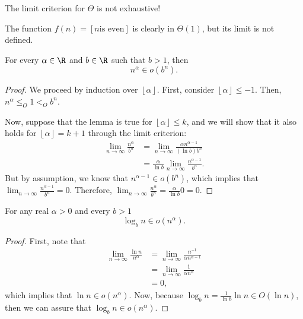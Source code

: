 \begin{note}
    The limit criterion for $\Theta$ is not exhaustive!
\end{note}
\begin{eg}
    The function $f(n) = \left[ n \text{is even} \right] $ is clearly in $\Theta(1)$, but its limit is not defined.
\end{eg}

\begin{lemma}
    For every $\alpha\in \R$ and $b\in \R$ such that $b>1$, then \[
	n^{\alpha} \in o(b^{n})
    .\] 
\end{lemma}
\begin{proof}
    We proceed by induction over $\left\lfloor \alpha \right\rfloor$.
    First, consider $\left\lfloor \alpha \right\rfloor \le  -1$.
    Then, $n^{\alpha}\le_O 1 <_O b^{n}$.

    Now, suppose that the lemma is true for $\left\lfloor \alpha \right\rfloor\le k$, and we will show that it also holds for $\left\lfloor \alpha \right\rfloor=k+1$ through the limit criterion:
    \begin{align*}
        \lim_{n \to \infty} \frac{n^{\alpha}}{b^{n}} &= \lim_{n \to \infty} \frac{\alpha n^{\alpha-1}}{(\ln b)b^{n}} \\
	&= \frac{\alpha}{\ln b} \lim_{n \to \infty} \frac{n^{\alpha-1}}{b^{n}}
    .\end{align*}
    But by assumption, we know that $n^{\alpha-1}\in o(b^{n})$, which implies that $\lim_{n \to \infty} \frac{n^{\alpha-1}}{b^{n}} = 0$.
    Therefore, $\lim_{n \to \infty} \frac{n^{\alpha}}{b^{n}} = \frac{\alpha}{\ln b} 0 = 0$.
\end{proof}

\begin{lemma}
    For any real $\alpha >0$ and every $b>1$ \[
    \log_b n \in o(n^{\alpha})
    .\] 
\end{lemma}
\begin{proof}
    First, note that
    \begin{align*}
        \lim_{n \to \infty} \frac{\ln n}{n^{\alpha}} &= \lim_{n \to \infty} \frac{n^{-1}}{\alpha n^{\alpha-1}} \\
	&= \lim_{n \to \infty} \frac{1}{\alpha n^{\alpha}} \\
	&= 0
    ,\end{align*}
    which implies that $\ln n \in o(n^{\alpha})$.
    Now, because $\log_b n = \frac{1}{\ln b} \ln n \in O(\ln n)$, then we can assure that $\log_b n \in o(n^{\alpha})$.
\end{proof}

